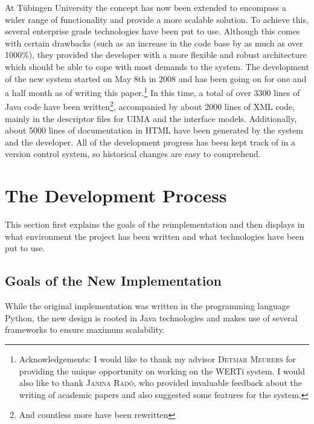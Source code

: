 \documentclass[12pt]{scrartcl}
\begin{document}
At Tübingen University the concept has now been extended to encompass a wider
range of functionality and provide a more scalable solution. To achieve this,
several enterprise grade technologies have been put to use. Although this comes
with certain drawbacks (such as an increase in the code base by as much as over
1000\%), they provided the developer with a more flexible and robust architecture which
should be able to cope with most demands to the system. The development of the
new system started on May 8th in 2008 and has been going on for one and a half month
as of writing this paper.\footnote{Acknowledgements:
I would like to thank my advisor \textsc{Detmar Meurers} for providing
the unique opportunity on working on the WERTi system. 
I would also like to thank \textsc{Janina Radó}, who provided invaluable feedback
about the writing of academic papers and also suggested some features for the
system.}
 In this time, a total of over 3300 lines of Java code
 have been written\footnote{And countless more have been rewritten}, accompanied by about 2000 lines of XML code, mainly in the
descriptor files for UIMA and the interface models.  Additionally, about 5000
lines of documentation in HTML have been generated by the system and the
developer. All of the development progress has been kept track of in a version
control system, so historical changes are easy to
comprehend.
\section{The Development Process}

This section first explains the goals of the reimplementation and then
displays in what environment the project has been written and what technologies
have been put to use.

\subsection{Goals of the New Implementation}

 While the original implementation was
 written in the programming language
 Python, the new design is rooted in Java
 technologies and makes use of several frameworks to ensure maximum scalability.
 
\end{document}

